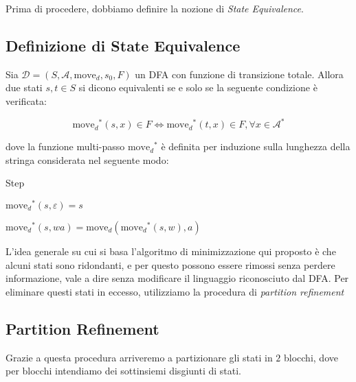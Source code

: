 \documentclass[class=book, crop=false, oneside, 12pt]{standalone}
\begin{document}
Prima di procedere, dobbiamo definire la nozione di \emph{State Equivalence}.

\subsection{Definizione di State Equivalence}
\begin{definition}
    Sia \(\mathcal{D} = (S,\mathcal{A},\textrm{move}_{d},s_{0},F)\) un DFA con funzione di transizione totale. Allora due stati \(s,t \in S\) si dicono equivalenti se e solo se la seguente condizione è verificata:

    \begin{equation}
        \textrm{move}_{d}\!^{*}(s,x) \in F \iff \textrm{move}_{d}\!^{*}(t,x) \in F,  \forall x \in \mathcal{A}^{*} 
    \end{equation}
    
    \noindent dove la funzione multi-passo \(\textrm{move}_{d}\!^{*}\) è definita per induzione sulla lunghezza della stringa considerata nel seguente modo:

    \begin{labeling}{Step}
        \item[Base] \(\textrm{move}_{d}\!^{*}(s,\varepsilon)=s\) 
        \item[Step] \(\textrm{move}_{d}\!^{*}(s,wa)= \textrm{move}_{d}(\textrm{move}_{d}\!^{*}(s,w),a)\)
    \end{labeling}    
\end{definition}

L'idea generale su cui si basa l'algoritmo di minimizzazione qui proposto è che alcuni stati sono ridondanti, e per questo possono essere rimossi senza perdere informazione, vale a dire senza modificare il linguaggio riconosciuto dal DFA. Per eliminare questi stati in eccesso, utilizziamo la procedura di \emph{partition refinement}

\subsection{Partition Refinement}
Grazie a questa procedura arriveremo a partizionare gli stati in \(2\) blocchi, dove per blocchi intendiamo dei sottinsiemi disgiunti di stati.
\end{document}
